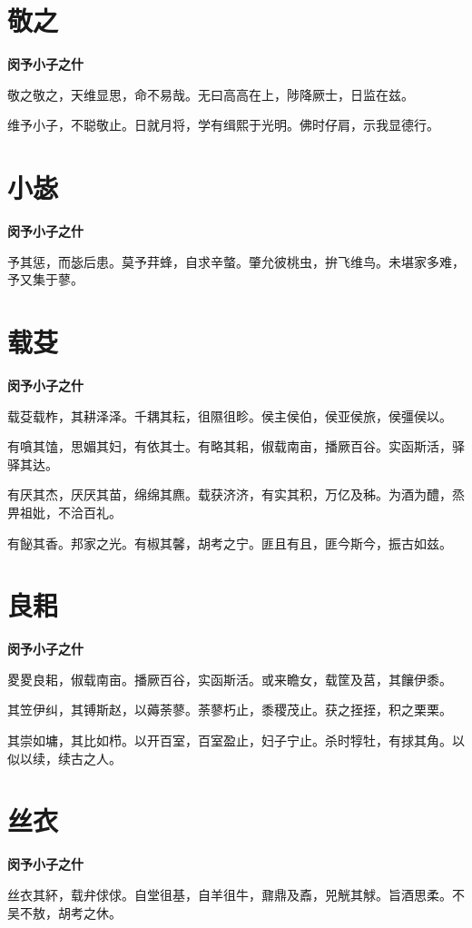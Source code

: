 \documentclass[12pt,a4paper]{ctexbook}
\begin{document}
\section{敬之}
\textbf{闵予小子之什}\par\vspace{0.5em}
敬之敬之，天维显思，命不易哉。无曰高高在上，陟降厥士，日监在兹。\par
维予小子，不聪敬止。日就月将，学有缉熙于光明。佛时仔肩，示我显德行。\par

\section{小毖}
\textbf{闵予小子之什}\par\vspace{0.5em}
予其惩，而毖后患。莫予荓蜂，自求辛螫。肇允彼桃虫，拚飞维鸟。未堪家多难，予又集于蓼。\par

\section{载芟}
\textbf{闵予小子之什}\par\vspace{0.5em}
载芟载柞，其耕泽泽。千耦其耘，徂隰徂畛。侯主侯伯，侯亚侯旅，侯彊侯以。\par
有嗿其馌，思媚其妇，有依其士。有略其耜，俶载南亩，播厥百谷。实函斯活，驿驿其达。\par
有厌其杰，厌厌其苗，绵绵其麃。载获济济，有实其积，万亿及秭。为酒为醴，烝畀祖妣，不洽百礼。\par
有飶其香。邦家之光。有椒其馨，胡考之宁。匪且有且，匪今斯今，振古如兹。\par

\section{良耜}
\textbf{闵予小子之什}\par\vspace{0.5em}
畟畟良耜，俶载南亩。播厥百谷，实函斯活。或来瞻女，载筐及莒，其饟伊黍。\par
其笠伊纠，其镈斯赵，以薅荼蓼。荼蓼朽止，黍稷茂止。获之挃挃，积之栗栗。\par
其崇如墉，其比如栉。以开百室，百室盈止，妇子宁止。杀时犉牡，有捄其角。以似以续，续古之人。\par

\section{丝衣}
\textbf{闵予小子之什}\par\vspace{0.5em}
丝衣其紑，载弁俅俅。自堂徂基，自羊徂牛，鼐鼎及鼒，兕觥其觩。旨酒思柔。不吴不敖，胡考之休。\par
\end{document}
